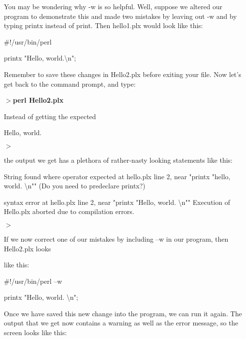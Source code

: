 \documentclass[a4paper,11pt]{book}
\begin{document}
\noindent 

\noindent You may be wondering why -w is so helpful.   Well, suppose we altered our program to demonstrate this and made two mistakes by leaving out -w and by typing printx instead of print. Then hello1.plx would look like this:

\noindent 

\noindent \#!/usr/bin/perl

\noindent 

\noindent printx "Hello, world.\textbackslash n";

\noindent 

\noindent Remember to save these changes in Hello2.plx before exiting your file. Now let's get back to the command prompt, and type:

\noindent 

\noindent \textbf{$>$perl Hello2.plx}

\noindent 

\noindent Instead of getting the expected

\noindent 

\noindent Hello, world.

\noindent $>$

\noindent 

\noindent the output we get has a plethora of rather-nasty looking statements like this:

\noindent 

\noindent String found where operator expected at hello.plx line 2, near "printx "hello, world. \textbackslash n"" (Do you need to predeclare printx?)

\noindent syntax error at hello.plx line 2, near "printx "Hello, world. \textbackslash n"" Execution of Hello.plx aborted due to compilation errors.

\noindent $>$

\noindent 

\noindent 

\noindent If we now  correct  one of our mistakes  by  including  --w in our program,  then  Hello2.plx looks

\noindent like this:

\noindent 

\noindent \#!/usr/bin/perl --w

\noindent 

\noindent printx "Hello, world. \textbackslash n";

\noindent 

\noindent Once we have saved this new change into the program, we can run it again. The output that we get now contains a warning as well as the error message, so the screen looks like this:
\end{document}
